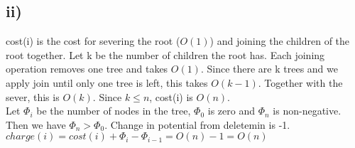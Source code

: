 \documentclass{article}
\begin{document}
\subsection*{ii)}
    cost(i) is the cost for severing the root ($O(1)$) and joining the children of the root 
    together. Let k be the number of children the root has. Each joining operation removes 
    one tree and takes $O(1)$. Since there are k trees and we apply join until only one tree 
    is left, this takes $O(k-1)$. Together with the sever, this is $O(k)$. Since $k \le n$, 
    cost(i) is $O(n)$.\\

    Let $\Phi_i$ be the number of nodes in the tree, $\Phi_0$ is zero and $\Phi_n$ is non-negative.
    Then we have $\Phi_n > \Phi_0$. Change in potential from deletemin is -1.
    $charge(i) = cost(i) + \Phi_i - \Phi_{i-1} = O(n) -1 = O(n)$
\end{document}
